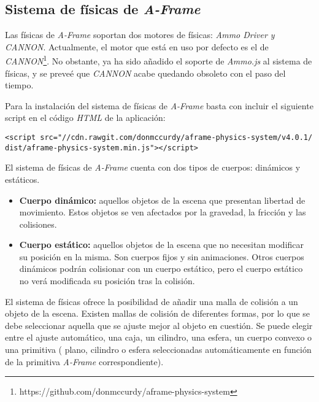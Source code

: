 \subsection{Sistema de físicas de \textit{A-Frame}}
Las físicas de \textit{A-Frame} soportan dos motores de físicas: \textit{Ammo Driver y CANNON}. Actualmente, el motor que está en uso por defecto es el de \textit{CANNON}\footnote{https://github.com/donmccurdy/aframe-physics-system}. No obstante, ya ha sido añadido el soporte de \textit{Ammo.js} al sistema de físicas, y se preveé que \textit{CANNON} acabe quedando obsoleto con el paso del tiempo. \newline

Para la instalación del sistema de físicas de \textit{A-Frame} basta con incluir el siguiente script en el código \textit{HTML} de la aplicación: 

\begin{verbatim}
<script src="//cdn.rawgit.com/donmccurdy/aframe-physics-system/v4.0.1/  
dist/aframe-physics-system.min.js"></script>
\end{verbatim}

El sistema de físicas de \textit{A-Frame} cuenta con dos tipos de cuerpos: dinámicos y estáticos.

\begin{itemize}
    \item \textbf{Cuerpo dinámico:} aquellos objetos de la escena que presentan libertad de movimiento. Estos objetos se ven afectados por la gravedad, la fricción y las colisiones.
    \item \textbf{Cuerpo estático:} aquellos objetos de la escena que no necesitan modificar su posición en la misma. Son cuerpos fijos y sin animaciones. Otros cuerpos dinámicos podrán colisionar con un cuerpo estático, pero el cuerpo estático no verá modificada su posición tras la colisión.
\end{itemize}

El sistema de físicas ofrece la posibilidad de añadir una malla de colisión a un objeto de la escena. Existen mallas de colisión de diferentes formas, por lo que se debe seleccionar aquella que se ajuste mejor al objeto en cuestión. Se puede elegir entre el ajuste automático, una caja, un cilindro, una esfera, un cuerpo convexo o una primitiva ( plano, cilindro o esfera seleccionadas automáticamente en función de la primitiva \textit{A-Frame} correspondiente). \newline


